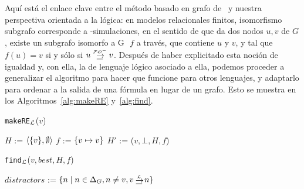 Aqu\'i est\'a el enlace clave entre el m\'etodo basado en grafo
de~\cite{Krahmer2003} y nuestra perspectiva orientada a la l\'ogica: en
modelos relacionales finitos, isomorfismo subgrafo corresponde a
\EPFOL-simulaciones, en el sentido de que da dos nodos $u,v$ de
$G$, existe un subgrafo isomorfo a G $ $ $ f $ a trav\'es, que contiene $ u $ y
$v$, y tal que $f(u)=v$ si y s\'olo si $u \simul{\+\EPFOL} v$.
%
Despu\'es de haber explicitado esta noci\'on de igualdad y, con ella, la de
lenguaje l\'ogico asociado a ella, podemos proceder a generalizar el
algoritmo para hacer que funcione para otros lenguajes, y adaptarlo para
ordenar a la salida de una f\'ormula en lugar de un grafo. Esto se muestra en los
Algoritmos~\ref{alg:makeRE} y~\ref{alg:find}.
%
\begin{center}\begin{minipage}[t]{5.1cm}%
\begin{algorithm}[H]\small
{}

\caption{\small \texttt{makeRE}$_{\mathcal{L}}$($v$)}\label{alg:makeRE}


\BlankLine

\vspace{3.0pt}

\BlankLine

$H$ := $\langle \{v\},\emptyset \rangle$\; $f$ := $\{v \mapsto v\}$\;
$H'$ := \findGraph($v, \bot, H, f$)\;
\BlankLine
{}\;
\end{algorithm}
  \end{minipage}
\hspace{.05cm}
  \begin{minipage}[t]{6.8cm}%
\begin{algorithm}[H] \small
{} 


\caption{\small \texttt{find}$_{\mathcal{L}}$($v, \mathit{best},H,f$)}\label{alg:find}

 $\mathit{distractors}$ := $\cset{n \mid n \in \Delta_G, n \neq v , v \simul{\+L} n}$\;
 \;
\end{algorithm}
  \end{minipage}%
\end{center}

